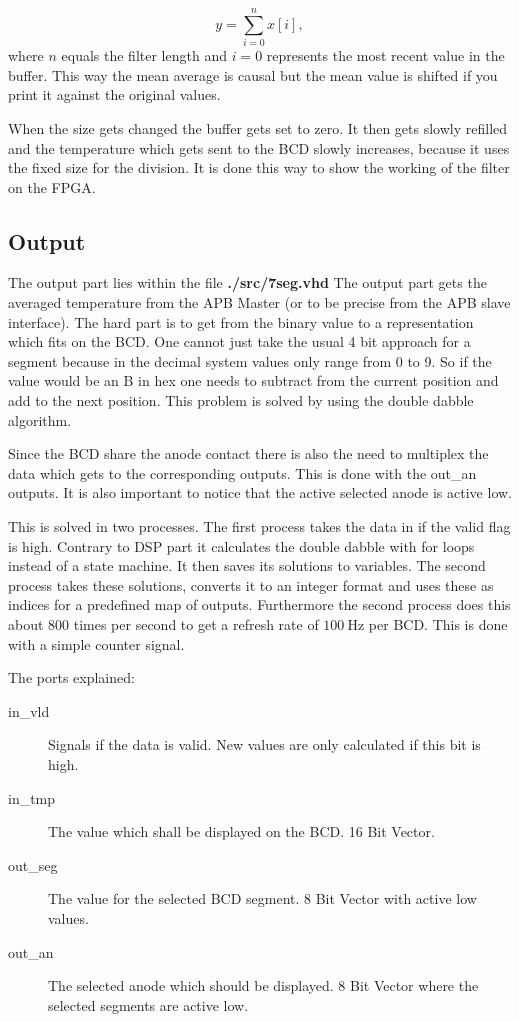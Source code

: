 \documentclass[%
	a4paper,
]
{article}
\begin{document}
\begin{equation*}
y = \sum_{i=0}^n x[i],
\end{equation*}
where $n$ equals the filter length and $i=0$ represents the most recent value in the buffer. This way the mean average is causal but the mean
value is shifted if you print it against the original values.


When the size gets changed the buffer gets set to zero. It then gets slowly refilled and the temperature
which gets sent to the BCD slowly increases, because it uses the fixed size for the division. 
It is done this way to show the working of the filter on the FPGA.

\subsection{Output}
The output part lies within the file \textbf{./src/7seg.vhd}
The output part gets the averaged temperature from the APB Master (or to be precise from the APB slave interface).
The hard part is to get from the binary value to a 
representation which fits on the BCD. One cannot just take the usual 4 bit approach for a segment 
because in the decimal system values only range from 0 to 9. So if the value would be an B in hex
one needs to subtract from the current position and add to the next position. This problem is solved
by using the double dabble algorithm.

Since the BCD share the anode contact there is also the need to multiplex the data which gets
to the corresponding outputs. This is done with the out\_an outputs. It is also important to notice
that the active selected anode is active low.

This is solved in two processes. The first process takes the data in if the valid flag is high. Contrary to 
DSP part it calculates the double dabble with for loops instead of a state machine. It then saves its
solutions to variables. The second process takes these solutions, converts it to an integer format and
uses these as indices for a predefined map of outputs. Furthermore the second process does this about
800 times per second to get a refresh rate of $100~\text{Hz}$ per BCD. This is done with a simple counter signal.

The ports explained:
\begin{description}
\item[in\_vld] Signals if the data is valid. New values are only calculated if this bit is high.
\item[in\_tmp] The value which shall be displayed on the BCD. 16 Bit Vector.
\item[out\_seg] The value for the selected BCD segment. 8 Bit Vector with active low values.
\item[out\_an] The selected anode which should be displayed. 8 Bit Vector where the selected segments
are active low.
\end{description}
\end{document}
